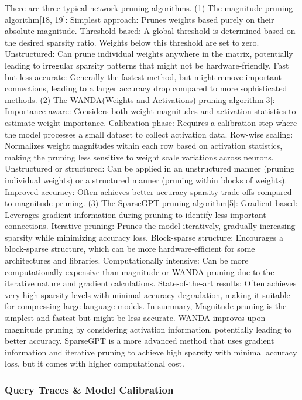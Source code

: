 \documentclass{article} %
\begin{document}
There are three typical network pruning algorithms.
(1) The magnitude pruning algorithm[18, 19]: Simplest approach: Prunes weights based purely on their absolute magnitude. Threshold-based: A global threshold is determined based on the desired sparsity ratio. Weights below this threshold are set to zero. Unstructured: Can prune individual weights anywhere in the matrix, potentially leading to irregular sparsity patterns that might not be hardware-friendly. Fast but less accurate: Generally the fastest method, but might remove important connections, leading to a larger accuracy drop compared to more sophisticated methods.
(2) The WANDA(Weights and Activations) pruning algorithm[3]: Importance-aware: Considers both weight magnitudes and activation statistics to estimate weight importance. Calibration phase: Requires a calibration step where the model processes a small dataset to collect activation data. Row-wise scaling: Normalizes weight magnitudes within each row based on activation statistics, making the pruning less sensitive to weight scale variations across neurons. Unstructured or structured: Can be applied in an unstructured manner (pruning individual weights) or a structured manner (pruning within blocks of weights). Improved accuracy: Often achieves better accuracy-sparsity trade-offs compared to magnitude pruning.
(3) The SparseGPT pruning algorithm[5]: Gradient-based: Leverages gradient information during pruning to identify less important connections. Iterative pruning: Prunes the model iteratively, gradually increasing sparsity while minimizing accuracy loss. Block-sparse structure: Encourages a block-sparse structure, which can be more hardware-efficient for some architectures and libraries. Computationally intensive: Can be more computationally expensive than magnitude or WANDA pruning due to the iterative nature and gradient calculations. State-of-the-art results: Often achieves very high sparsity levels with minimal accuracy degradation, making it suitable for compressing large language models.
In summary, Magnitude pruning is the simplest and fastest but might be less accurate. WANDA improves upon magnitude pruning by considering activation information, potentially leading to better accuracy. SparseGPT is a more advanced method that uses gradient information and iterative pruning to achieve high sparsity with minimal accuracy loss, but it comes with higher computational cost.

\subsubsection{Query Traces \& Model Calibration}
\end{document}
